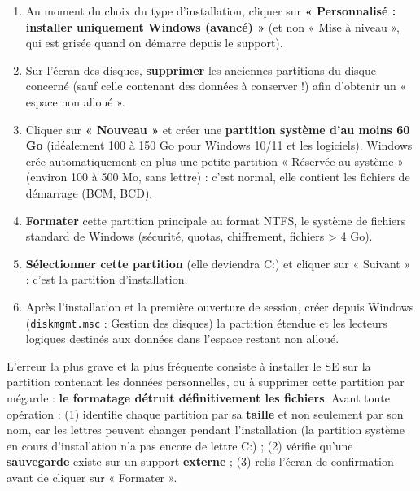 \documentclass[11pt]{article}
\newcommand{\cle}[1]{{\popxbold\color{popdark}#1}}
\begin{document}
\begin{methode}
\begin{enumerate}
\item Au moment du choix du type d'installation, cliquer sur \textbf{« Personnalisé : installer uniquement Windows (avancé) »} (et non « Mise à niveau », qui est grisée quand on démarre depuis le support).
\item Sur l'écran des disques, \textbf{supprimer} les anciennes partitions du disque concerné (sauf celle contenant des données à conserver !) afin d'obtenir un « espace non alloué ».
\item Cliquer sur \textbf{« Nouveau »} et créer une \textbf{partition système d'au moins 60 Go} (idéalement 100 à 150 Go pour Windows 10/11 et les logiciels). Windows crée automatiquement en plus une petite partition « Réservée au système » (environ 100 à 500 Mo, sans lettre) : c'est normal, elle contient les fichiers de démarrage (BCM, BCD).
\item \textbf{Formater} cette partition principale au format \cle{NTFS}, le système de fichiers standard de Windows (sécurité, quotas, chiffrement, fichiers > 4 Go).
\item \textbf{Sélectionner cette partition} (elle deviendra C:) et cliquer sur « Suivant » : c'est la \cle{partition d'installation}.
\item Après l'installation et la première ouverture de session, créer depuis Windows (\texttt{diskmgmt.msc} : Gestion des disques) la partition étendue et les lecteurs logiques destinés aux données dans l'espace restant non alloué.
\end{enumerate}
\end{methode}

\begin{attention}
L'erreur la plus grave et la plus fréquente consiste à installer le SE sur la partition contenant les données personnelles, ou à supprimer cette partition par mégarde : \textbf{le formatage détruit définitivement les fichiers}. Avant toute opération : (1) identifie chaque partition par sa \textbf{taille} et non seulement par son nom, car les lettres peuvent changer pendant l'installation (la partition système en cours d'installation n'a pas encore de lettre C:) ; (2) vérifie qu'une \textbf{sauvegarde} existe sur un support \textbf{externe} ; (3) relis l'écran de confirmation avant de cliquer sur « Formater ».
\end{attention}
\end{document}
